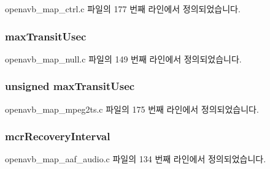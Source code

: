 openavb\+\_\+map\+\_\+ctrl.\+c 파일의 177 번째 라인에서 정의되었습니다.

\subsubsection[{\texorpdfstring{max\+Transit\+Usec}{maxTransitUsec}}]{ max\+Transit\+Usec}\hypertarget{structpvt__data__t_a3838a4b3ace56e06dc76c5b13f1df3ff}{}\label{structpvt__data__t_a3838a4b3ace56e06dc76c5b13f1df3ff}


openavb\+\_\+map\+\_\+null.\+c 파일의 149 번째 라인에서 정의되었습니다.

\subsubsection[{\texorpdfstring{max\+Transit\+Usec}{maxTransitUsec}}]{\setlength{\rightskip}{0pt plus 5cm}unsigned max\+Transit\+Usec}\hypertarget{structpvt__data__t_acfd06fcb37c8f4fdd3c99ff94537ac12}{}\label{structpvt__data__t_acfd06fcb37c8f4fdd3c99ff94537ac12}


openavb\+\_\+map\+\_\+mpeg2ts.\+c 파일의 175 번째 라인에서 정의되었습니다.

\subsubsection[{\texorpdfstring{mcr\+Recovery\+Interval}{mcrRecoveryInterval}}]{ mcr\+Recovery\+Interval}\hypertarget{structpvt__data__t_a044a8c3f14753f4d27f9053b5cea5c60}{}\label{structpvt__data__t_a044a8c3f14753f4d27f9053b5cea5c60}


openavb\+\_\+map\+\_\+aaf\+\_\+audio.\+c 파일의 134 번째 라인에서 정의되었습니다.

